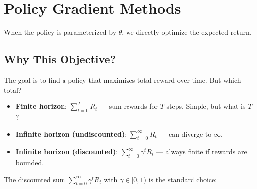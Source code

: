 \section{Policy Gradient Methods}

When the policy is parameterized by $\theta$, we directly optimize the expected return.

\subsection{Why This Objective?}

The goal is to find a policy that maximizes total reward over time. But which total?

\begin{itemize}
    \item \textbf{Finite horizon}: $\sum_{t=0}^{T} R_t$ — sum rewards for $T$ steps. Simple, but what is $T$?
    \item \textbf{Infinite horizon (undiscounted)}: $\sum_{t=0}^{\infty} R_t$ — can diverge to $\infty$.
    \item \textbf{Infinite horizon (discounted)}: $\sum_{t=0}^{\infty} \gamma^t R_t$ — always finite if rewards are bounded.
\end{itemize}

The discounted sum $\sum_{t=0}^{\infty} \gamma^t R_t$ with $\gamma \in [0,1)$ is the standard choice:
\begin{center}
\end{center}

